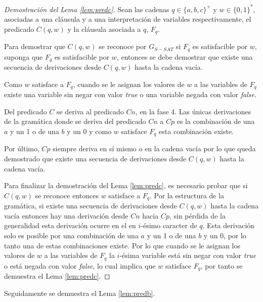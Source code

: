 \documentclass[12pt]{article}
\newcommand{\true}{\textit{true}}
\newcommand{\false}{\textit{false}}
\begin{document}
\begin{proof}[Demostración del Lema \ref{lem:predc}]
    Sean las cadenas $q\in \{a,b,c\}^+$ y $w\in \{0,1\}^*$, asociadas a una cláusula y a una interpretación de 
    variables respectivamente, el predicado $C(q,w)$ y la cláusula asociada a $q$, $F_q$. 
    
    Para demostrar que $C(q,w)$ se reconoce por $G_{S-SAT}$ si $F_q$ es satisfacible por $w$, suponga que $F_q$ es satisfacible por $w$, entonces se debe demostrar que existe una secuencia de derivaciones desde $C(q,w)$ hasta la cadena vacía.
    
    Como $w$ satisface a $F_q$, cuando se le asignan los valores de $w$ a las variables de $F_q$ existe una variable sin negar con valor \true{} o una variable negada con valor \false{}.
    
    Del predicado $C$ se deriva al predicado $Cn$, en la fase 4. Las únicas derivaciones de la gramática donde se deriva del predicado $Cn$ a $Cp$ es la combinación de una $a$ y un 1 o de una $b$ y un 0 y como $w$ satisface $F_q$ esta combinación existe. 
    
    Por último, $Cp$ siempre deriva en sí mismo o en la cadena vacía por lo que queda demostrado que existe una secuencia de derivaciones desde $C(q,w)$ hasta la cadena vacía.
    
    Para finalizar la demostración del Lema \ref{lem:predc}, es necesario probar que si $C(q,w)$ se reconoce entonces $w$ satisface a $F_q$. Por la estructura de la gramática, si existe una secuencia de derivaciones desde $C(q,w)$ hasta la cadena vacía entonces hay una derivación desde $Cn$ hacia $Cp$, sin pérdida de la generalidad esta derivación ocurre en el en $i$-ésimo caracter de $q$. Esta derivación solo es posible por una combinación de una $a$ y un 1 o de una $b$ y un 0, por lo tanto una de estas combinaciones existe. Por lo que cuando se le asignan los valores de $w$ a las variables de $F_q$ la $i$-ésima variable está
    sin negar con valor \true{} o está negada con valor \false{}, lo cual implica que $w$ satisface $F_q$, por tanto se demuestra el Lema \ref{lem:predc}.
\end{proof}


Seguidamente se demuestra el Lema \ref{lem:predb}.
\end{document}
